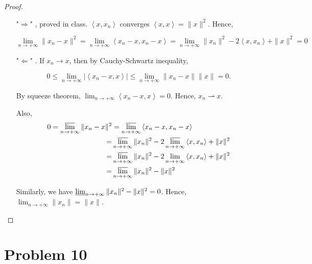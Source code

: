 \documentclass[12pt]{article}
\begin{document}
\begin{proof}

\begin{enumerate}
\item ["$\Rightarrow$"], proved in class. 
 $\left\langle x, x_n \right\rangle$ converges $\left\langle x, x \right\rangle = \|x\|^2$. Hence, 
 
$$
\lim_{n\rightarrow +\infty} \|x_n - x\|^2 = \lim_{n\rightarrow +\infty} \left\langle x_n - x, x_n - x \right\rangle = \lim_{n\rightarrow +\infty} \|x_n\|^2 - 2\left\langle x, x_n \right\rangle + \|x\|^2 = 0
$$

\item ["$\Leftarrow$"]. If $x_n\rightarrow x$, then by Cauchy-Schwartz inequality,

$$
0\leqslant \lim_{n\rightarrow +\infty} \left| \left\langle x_n - x, x \right\rangle\right| \leqslant \lim_{n\rightarrow +\infty} \|x_n - x\| \|x\| = 0.
$$

By squeeze theorem, $\lim_{n\rightarrow +\infty} \left\langle x_n - x, x \right\rangle = 0$. Hence, $x_n \rightharpoonup x$. 

Also, 
$$
\begin{aligned}
0 = \varlimsup_{n\rightarrow +\infty} \|x_n - x\|^2 & = \varlimsup_{n\rightarrow +\infty} \left\langle x_n - x, x_n - x \right\rangle\\
 = &  \varlimsup_{n\rightarrow +\infty} \|x_n\|^2 - 2 \varlimsup_{n\rightarrow +\infty} \left\langle x, x_n \right\rangle + \|x\|^2 \\
= &  \varlimsup_{n\rightarrow +\infty} \|x_n\|^2 - 2 \lim_{n\rightarrow +\infty} \left\langle x, x_n \right\rangle + \|x\|^2 \\
= &  \varlimsup_{n\rightarrow +\infty} \|x_n\|^2 - \|x\|^2
\end{aligned}
$$

Similarly, we have $\varliminf_{n\rightarrow +\infty} \|x_n\|^2 - \|x\|^2 = 0$. Hence, $\lim_{n\rightarrow +\infty} \|x_n\| = \|x\|$.

\end{enumerate}
\end{proof}

\section*{Problem 10}
\end{document}
